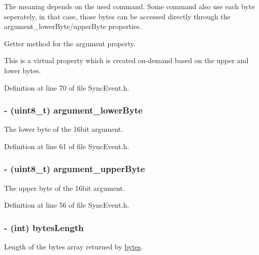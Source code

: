 The meaning depends on the used command. Some command also use each byte seperately, in that case, those bytes can be accessed directly through the argument\_\-lowerByte/upperByte properties.

Getter method for the argument property.

This is a virtual property which is created on-\/demand based on the upper and lower bytes. 

Definition at line 70 of file SyncEvent.h.

\hypertarget{interface_sync_event_a4300b74bd54ca339d5fdbf0187a32d50}{
\subsubsection[{argument\_\-lowerByte}]{\setlength{\rightskip}{0pt plus 5cm}-\/ (uint8\_\-t) argument\_\-lowerByte}}
\label{interface_sync_event_a4300b74bd54ca339d5fdbf0187a32d50}
The lower byte of the 16bit argument. 

Definition at line 61 of file SyncEvent.h.

\hypertarget{interface_sync_event_aabc9ba86996bb61d9eb530b84f5a16f9}{
\subsubsection[{argument\_\-upperByte}]{\setlength{\rightskip}{0pt plus 5cm}-\/ (uint8\_\-t) argument\_\-upperByte}}
\label{interface_sync_event_aabc9ba86996bb61d9eb530b84f5a16f9}
The upper byte of the 16bit argument. 

Definition at line 56 of file SyncEvent.h.

\hypertarget{interface_sync_event_a539fd2db1da9757b1e4cb56c56313b91}{
\subsubsection[{bytesLength}]{\setlength{\rightskip}{0pt plus 5cm}-\/ (int) bytesLength}}
\label{interface_sync_event_a539fd2db1da9757b1e4cb56c56313b91}
Length of the bytes array returned by \hyperlink{interface_sync_event_a484f93618ed90870534d4632b0bb811b}{bytes}. 

